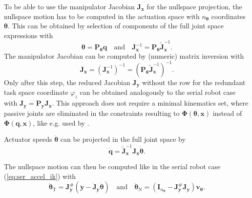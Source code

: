 \documentclass[a4paper,twoside]{article}
\begin{document}
To be able to use the manipulator Jacobian $\bm{J}_{\bm{x}}$ for the nullspace projection, the nullspace motion has to be computed in the actuation space with $n_{\bm{\theta}}$ coordinates $\bm{\theta}$.
This can be obtained by selection of components of the full joint space expressions with
%
\begin{equation}
\bm{\theta} = \bm{P}_{\bm{\theta}} \bm{q}
\quad \mathrm{and} \quad
\bm{J}_{\bm{x}}^{-1}=\bm{P}_{\bm{\theta}} \tilde{\bm{J}}_{\bm{x}}^{-1}.
\label{eq:parrob_jacobian}
\end{equation}
%
The manipulator Jacobian can be computed by (numeric) matrix inversion with
%
\vspace{-0.1cm} %
\begin{equation}
\bm{J}_{\bm{x}} 
= \left(\bm{J}_{\bm{x}}^{-1}\right)^{-1}
= \left(\bm{P}_{\bm{\theta}} \tilde{\bm{J}}_{\bm{x}}^{-1}\right)^{-1}.
\label{eq:par_jacobi_inv}
\end{equation}
%
Only after this step, the reduced Jacobian $\bm{J}_{\bm{y}}$ without the row for the redundant task space coordinate $\varphi_z$ can be obtained analogously to the serial robot case with
$\bm{J}_{\bm{y}} = \bm{P}_{\bm{y}} \bm{J}_{\bm{x}}$.
%
This approach does not require a minimal kinematics set, where passive joints are eliminated in the constraints resulting to $\bm{\Phi}(\bm{\theta},\bm{x})$ instead of  $\bm{\Phi}(\bm{q},\bm{x})$, like e.g. used by \cite{AgarwalNasBan2016}.

Actuator speeds $\dot{\bm{\theta}}$ can be projected in the full joint space by
\vspace{-0.1cm} %
\begin{equation}
\dot{\bm{q}}=\tilde{\bm{J}}^{-1}_{\bm{x}}\bm{J}_{\bm{x}} \dot{\bm{\theta}}.
\label{eq:par_nullspace_acttofull}
\end{equation}

The nullspace motion can then be computed like in the serial robot case (\ref{eq:ser_accel_ik}) with
\begin{equation}
\ddot{\bm{\theta}}_\mathrm{T} = \bm{J}_{\bm{y}}^{\#}(\ddot{\bm{y}} - \dot{\bm{J}}_{\bm{y}} \dot{\bm{\theta}})
\quad \mathrm{and} \quad
\ddot{\bm{\theta}}_\mathrm{N} = (\bm{I}_{n_{\bm{\theta}}}-\bm{J}_{\bm{y}}^{\#}\bm{J}_{\bm{y}}) \bm{v}_{\bm{\theta}}.
\label{eq:par_nullspace_actjoint}
\end{equation}
\end{document}
